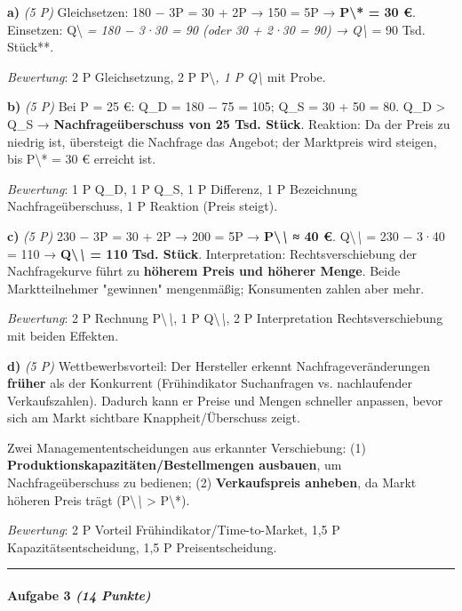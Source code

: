 \documentclass[11pt, a4paper]{article}
\begin{document}
\textbf{a)} \textit{(5 P)} Gleichsetzen: 180 − 3P = 30 + 2P → 150 = 5P → \textbf{P\textbackslash{}* = 30 €}. Einsetzen: Q\textbackslash{}\textit{ = 180 − 3·30 = 90 (oder 30 + 2·30 = 90) → }\textit{Q\textbackslash{}} = 90 Tsd. Stück**.

\textit{Bewertung}: 2 P Gleichsetzung, 2 P P\textbackslash{}\textit{, 1 P Q\textbackslash{}} mit Probe.


\textbf{b)} \textit{(5 P)} Bei P = 25 €: Q\_D = 180 − 75 = 105; Q\_S = 30 + 50 = 80. Q\_D > Q\_S → \textbf{Nachfrageüberschuss von 25 Tsd. Stück}. Reaktion: Da der Preis zu niedrig ist, übersteigt die Nachfrage das Angebot; der Marktpreis wird steigen, bis P\textbackslash{}* = 30 € erreicht ist.

\textit{Bewertung}: 1 P Q\_D, 1 P Q\_S, 1 P Differenz, 1 P Bezeichnung Nachfrageüberschuss, 1 P Reaktion (Preis steigt).


\textbf{c)} \textit{(5 P)} 230 − 3P = 30 + 2P → 200 = 5P → \textbf{P\textbackslash{}\textit{\textbackslash{}} ≈ 40 €}. Q\textbackslash{}\textit{\textbackslash{}} = 230 − 3·40 = 110 → \textbf{Q\textbackslash{}\textit{\textbackslash{}} = 110 Tsd. Stück}. Interpretation: Rechtsverschiebung der Nachfragekurve führt zu \textbf{höherem Preis und höherer Menge}. Beide Marktteilnehmer "gewinnen" mengenmäßig; Konsumenten zahlen aber mehr.

\textit{Bewertung}: 2 P Rechnung P\textbackslash{}\textit{\textbackslash{}}, 1 P Q\textbackslash{}\textit{\textbackslash{}}, 2 P Interpretation Rechtsverschiebung mit beiden Effekten.


\textbf{d)} \textit{(5 P)} Wettbewerbsvorteil: Der Hersteller erkennt Nachfrageveränderungen \textbf{früher} als der Konkurrent (Frühindikator Suchanfragen vs. nachlaufender Verkaufszahlen). Dadurch kann er Preise und Mengen schneller anpassen, bevor sich am Markt sichtbare Knappheit/Überschuss zeigt.

Zwei Managemententscheidungen aus erkannter Verschiebung: (1) \textbf{Produktionskapazitäten/Bestellmengen ausbauen}, um Nachfrageüberschuss zu bedienen; (2) \textbf{Verkaufspreis anheben}, da Markt höheren Preis trägt (P\textbackslash{}\textit{\textbackslash{}} > P\textbackslash{}*).

\textit{Bewertung}: 2 P Vorteil Frühindikator/Time-to-Market, 1,5 P Kapazitätsentscheidung, 1,5 P Preisentscheidung.



\noindent\textcolor{rulegray}{\rule{\linewidth}{0.4pt}}


\paragraph{Aufgabe 3 \textit{(14 Punkte)}}\mbox{}\\[2pt]
\end{document}
